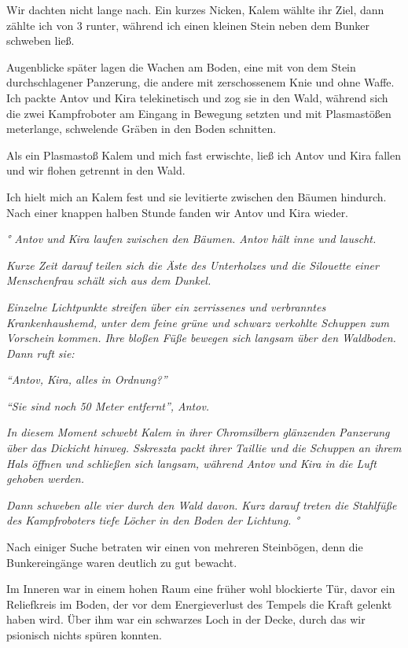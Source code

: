 \documentclass[11pt]{article}
\begin{document}
Wir dachten nicht lange nach. Ein kurzes Nicken, Kalem wählte ihr Ziel,
dann zählte ich von 3 runter, während ich einen kleinen Stein neben dem
Bunker schweben ließ.

Augenblicke später lagen die Wachen am Boden, eine mit von dem Stein
durchschlagener Panzerung, die andere mit zerschossenem Knie und ohne
Waffe. Ich packte Antov und Kira telekinetisch und zog sie in den Wald,
während sich die zwei Kampfroboter am Eingang in Bewegung setzten und
mit Plasmastößen meterlange, schwelende Gräben in den Boden schnitten.

Als ein Plasmastoß Kalem und mich fast erwischte, ließ ich Antov und
Kira fallen und wir flohen getrennt in den Wald.

Ich hielt mich an Kalem fest und sie levitierte zwischen den Bäumen
hindurch. Nach einer knappen halben Stunde fanden wir Antov und Kira
wieder.

\emph{° Antov und Kira laufen zwischen den Bäumen. Antov hält inne und
lauscht.}

\emph{Kurze Zeit darauf teilen sich die Äste des Unterholzes und die
Silouette einer Menschenfrau schält sich aus dem Dunkel.}

\emph{Einzelne Lichtpunkte streifen über ein zerrissenes und verbranntes
Krankenhaushemd, unter dem feine grüne und schwarz verkohlte Schuppen
zum Vorschein kommen. Ihre bloßen Füße bewegen sich langsam über den
Waldboden. Dann ruft sie:}

\emph{``Antov, Kira, alles in Ordnung?''}

\emph{``Sie sind noch 50 Meter entfernt'', Antov.}

\emph{In diesem Moment schwebt Kalem in ihrer Chromsilbern glänzenden
Panzerung über das Dickicht hinweg. Sskreszta packt ihrer Taillie und
die Schuppen an ihrem Hals öffnen und schließen sich langsam, während
Antov und Kira in die Luft gehoben werden.}

\emph{Dann schweben alle vier durch den Wald davon. Kurz darauf treten
die Stahlfüße des Kampfroboters tiefe Löcher in den Boden der Lichtung.
°}

Nach einiger Suche betraten wir einen von mehreren Steinbögen, denn die
Bunkereingänge waren deutlich zu gut bewacht.

Im Inneren war in einem hohen Raum eine früher wohl blockierte Tür,
davor ein Reliefkreis im Boden, der vor dem Energieverlust des Tempels
die Kraft gelenkt haben wird. Über ihm war ein schwarzes Loch in der
Decke, durch das wir psionisch nichts spüren konnten.
\end{document}
